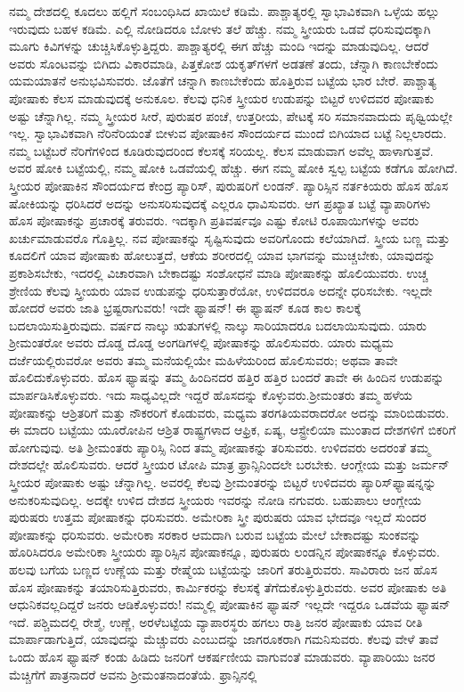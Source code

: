 ನಮ್ಮ ದೇಶದಲ್ಲಿ ಕೂದಲು ಹಲ್ಲಿಗೆ ಸಂಬಂಧಿಸಿದ ಖಾಯಿಲೆ ಕಡಿಮೆ. ಪಾಶ್ಚಾತ್ಯರಲ್ಲಿ ಸ್ವಾಭಾವಿಕವಾಗಿ ಒಳ್ಳೆಯ ಹಲ್ಲು ಇರುವುದು ಬಹಳ ಕಡಿಮೆ. ಎಲ್ಲಿ ನೋಡಿದರೂ ಬೋಳು ತಲೆ ಹೆಚ್ಚು. ನಮ್ಮ ಸ್ತ್ರೀಯರು ಒಡವೆ ಧರಿಸುವುದಕ್ಕಾಗಿ ಮೂಗು ಕಿವಿಗಳನ್ನು ಚುಚ್ಚಿಸಿಕೊಳ್ಳುತ್ತಿದ್ದರು. ಪಾಶ್ಚಾತ್ಯರಲ್ಲಿ ಈಗ ಹೆಚ್ಚು ಮಂದಿ ಇದನ್ನು ಮಾಡುವುದಿಲ್ಲ. ಆದರೆ ಅವರು ಸೊಂಟವನ್ನು ಬಿಗಿದು ವಿಕಾರಮಾಡಿ, ಪಿತ್ತಕೋಶ ಯಕೃತ್​ಗಳಗೆ ಅಡತಣೆ ತಂದು, ಚೆನ್ನಾಗಿ ಕಾಣಬೇಕೆಂದು ಯಮಯಾತನೆ ಅನುಭವಿಸುವರು. ಜೊತೆಗೆ ಚನ್ನಾಗಿ ಕಾಣಬೇಕೆಂದು ಹೊತ್ತಿರುವ ಬಟ್ಟೆಯ ಭಾರ ಬೇರೆ. ಪಾಶ್ಚಾತ್ಯ ಪೋಷಾಕು ಕೆಲಸ ಮಾಡುವುದಕ್ಕೆ ಅನುಕೂಲ. ಕೆಲವು ಧನಿಕ ಸ್ತ್ರೀಯರ ಉಡುಪನ್ನು ಬಿಟ್ಟರೆ ಉಳಿದವರ ಪೋಷಾಕು ಅಷ್ಟು ಚೆನ್ನಾಗಿಲ್ಲ. ನಮ್ಮ ಸ್ತ್ರೀಯರ ಸೀರೆ, ಪುರುಷರ ಪಂಚೆ, ಉತ್ತರೀಯ, ಪೇಟಕ್ಕೆ ಸರಿ ಸಮಾನವಾದುದು ಪೃಥ್ವಿಯಲ್ಲೇ ಇಲ್ಲ. ಸ್ವಾಭಾವಿಕವಾಗಿ ನೆರಿನೆರಿಯಂತೆ ಬೀಳುವ ಪೋಷಾಕಿನ ಸೌಂದರ್ಯದ ಮುಂದೆ ಬಿಗಿಯಾದ ಬಟ್ಟೆ ನಿಲ್ಲಲಾರದು. ನಮ್ಮ ಬಟ್ಟೆಬರೆ ನೆರಿಗೆಗಳಿಂದ ಕೂಡಿರುವುದರಿಂದ ಕೆಲಸಕ್ಕೆ ಸರಿಯಲ್ಲ. ಕೆಲಸ ಮಾಡುವಾಗ ಅವೆಲ್ಲ ಹಾಳಾಗುತ್ತವೆ. ಅವರ ಷೋಕಿ ಬಟ್ಟೆಯಲ್ಲಿ, ನಮ್ಮ ಷೋಕಿ ಒಡವೆಯಲ್ಲಿ ಹೆಚ್ಚು. ಈಗ ನಮ್ಮ ಷೋಕಿ ಸ್ವಲ್ಪ ಬಟ್ಟೆಯ ಕಡೆಗೂ ಹೋಗಿದೆ. ಸ್ತ್ರೀಯರ ಪೋಷಾಕಿನ ಸೌಂದರ್ಯದ ಕೇಂದ್ರ ಪ್ಯಾರಿಸ್​, ಪುರುಷರಿಗೆ ಲಂಡನ್​. ಪ್ಯಾರಿಸ್ಸಿನ ನರ್ತಕಿಯರು ಹೊಸ ಹೊಸ ಷೋಕಿಯನ್ನು ಧರಿಸಿದರೆ ಅದನ್ನು ಅನುಸರಿಸುವುದಕ್ಕೆ ಎಲ್ಲರೂ ಧಾವಿಸುವರು. ಆಗ ಪ್ರಖ್ಯಾತ ಬಟ್ಟೆ ವ್ಯಾಪಾರಿಗಳು ಹೊಸ ಪೋಷಾಕನ್ನು ಪ್ರಚಾರಕ್ಕೆ ತರುವರು. ಇದಕ್ಕಾಗಿ ಪ್ರತಿವರ್ಷವೂ ಎಷ್ಟು ಕೋಟಿ ರೂಪಾಯಿಗಳನ್ನು ಅವರು ಖರ್ಚುಮಾಡುವರೊ ಗೊತ್ತಿಲ್ಲ. ನವ ಪೋಷಾಕನ್ನು ಸೃಷ್ಟಿಸುವುದು ಅವರಿಗೊಂದು ಕಲೆಯಾಗಿದೆ. ಸ್ತ್ರೀಯ ಬಣ್ಣ ಮತ್ತು ಕೂದಲಿಗೆ ಯಾವ ಪೋಷಾಕು ಹೋಲುತ್ತದೆ, ಆಕೆಯ ಶರೀರದಲ್ಲಿ ಯಾವ ಭಾಗವನ್ನು ಮುಚ್ಚಬೇಕು, ಯಾವುದನ್ನು ಪ್ರಕಾಶಿಸಬೇಕು, ಇದರಲ್ಲಿ ವಿಚಾರವಾಗಿ ಬೇಕಾದಷ್ಟು ಸಂಶೋಧನೆ ಮಾಡಿ ಪೋಷಾಕನ್ನು ಹೊಲಿಯುವರು. ಉಚ್ಚ ಶ್ರೇಣಿಯ ಕೆಲವು ಸ್ತ್ರೀಯರು ಯಾವ ಉಡುಪನ್ನು ಧರಿಸುತ್ತಾರೆಯೋ, ಉಳಿದವರೂ ಅದನ್ನೇ ಧರಿಸಬೇಕು. ಇಲ್ಲದೇ ಹೋದರೆ ಅವರು ಜಾತಿ ಭ್ರಷ್ಟರಾಗುವರು! ಇದೇ ಫ್ಯಾಷನ್​! ಈ ಫ್ಯಾಷನ್​ ಕೂಡ ಕಾಲ ಕಾಲಕ್ಕೆ ಬದಲಾಯಿಸುತ್ತಿರುವುದು. ವರ್ಷದ ನಾಲ್ಕು ಋತುಗಳಲ್ಲಿ ನಾಲ್ಕು ಸಾರಿಯಾದರೂ ಬದಲಾಯಿಸುವುದು. ಯಾರು ಶ‍್ರೀಮಂತರೋ ಅವರು ದೊಡ್ಡ ದೊಡ್ಡ ಅಂಗಡಿಗಳಲ್ಲಿ ಪೋಷಾಕನ್ನು ಹೊಲಿಸುವರು. ಯಾರು ಮಧ್ಯಮ ದರ್ಜೆಯಲ್ಲಿರುವರೋ ಅವರು ತಮ್ಮ ಮನೆಯಲ್ಲಿಯೇ ಮಹಿಳೆಯರಿಂದ ಹೊಲಿಸುವರು; ಅಥವಾ ತಾವೇ ಹೊಲಿದುಕೊಳ್ಳುವರು. ಹೊಸ ಫ್ಯಾಷನ್ನು ತಮ್ಮ ಹಿಂದಿನದರ ಹತ್ತಿರ ಹತ್ತಿರ ಬಂದರೆ ತಾವೇ ಈ ಹಿಂದಿನ ಉಡುಪನ್ನು ಮಾರ್ಪಡಿಸಿಕೊಳ್ಳುವರು. ಇದು ಸಾಧ್ಯವಿಲ್ಲದೇ ಇದ್ದರೆ ಹೊಸದನ್ನು ಕೊಳ್ಳುವರು.\break ಶ‍್ರೀಮಂತರು ತಮ್ಮ ಹಳೆಯ ಪೋಷಾಕನ್ನು ಆಶ್ರಿತರಿಗೆ ಮತ್ತು ನೌಕರರಿಗೆ ಕೊಡುವರು, ಮಧ್ಯಮ ತರಗತಿಯವರಾದರೋ ಅದನ್ನು ಮಾರಿಬಿಡುವರು. ಈ ಮಾದರಿ ಬಟ್ಟೆಯು ಯೂರೋಪಿನ ಆಶ್ರಿತ ರಾಷ್ಟ್ರಗಳಾದ ಆಫ್ರಿಕ, ಏಷ್ಯ, ಆಸ್ಟ್ರೇಲಿಯಾ ಮುಂತಾದ ದೇಶಗಳಿಗೆ ಬಿಕರಿಗೆ ಹೋಗುವುವು. ಅತಿ ಶ‍್ರೀಮಂತರು ಪ್ಯಾರಿಸ್ಸಿ ನಿಂದ ತಮ್ಮ ಪೋಷಾಕನ್ನು ತರಿಸುವರು. ಉಳಿದವರು ಅದರಂತೆ ತಮ್ಮ ದೇಶದಲ್ಲೇ ಹೊಲಿಸುವರು. ಆದರೆ ಸ್ತ್ರೀಯರ ಟೋಪಿ ಮಾತ್ರ ಫ್ರಾನ್ಸಿನಿಂದಲೇ ಬರಬೇಕು. ಆಂಗ್ಲೇಯ ಮತ್ತು ಜರ್ಮನ್​ ಸ್ತ್ರೀಯರ ಪೋಷಾಕು ಅಷ್ಟು ಚೆನ್ನಾಗಿಲ್ಲ. ಅವರಲ್ಲಿ ಕೆಲವು ಶ‍್ರೀಮಂತರನ್ನು ಬಿಟ್ಟರೆ ಉಳಿದವರು ಪ್ಯಾರಿಸ್​ ಫ್ಯಾಷನ್ನನ್ನು ಅನುಕರಿಸುವುದಿಲ್ಲ. ಅದಕ್ಕೇ ಉಳಿದ ದೇಶದ ಸ್ತ್ರೀಯರು ಇವರನ್ನು ನೋಡಿ ನಗುವರು. ಬಹುಪಾಲು ಆಂಗ್ಲೇಯ ಪುರುಷರು ಉತ್ತಮ ಪೋಷಾಕನ್ನು ಧರಿಸುವರು. ಅಮೇರಿಕಾ ಸ್ತ್ರೀ ಪುರುಷರು ಯಾವ ಭೇದವೂ ಇಲ್ಲದೆ ಸುಂದರ ಪೋಷಾಕನ್ನು ಧರಿಸುವರು. ಅಮೇರಿಕಾ ಸರಕಾರ ಆಮದಾಗಿ ಬರುವ ಬಟ್ಟೆಯ ಮೇಲೆ ಬೇಕಾದಷ್ಟು ಸುಂಕವನ್ನು ಹೊರಿಸಿದರೂ ಅಮೇರಿಕಾ ಸ್ತ್ರೀಯರು ಪ್ಯಾರಿಸ್ಸಿನ ಪೋಷಾಕನ್ನೂ, ಪುರುಷರು ಲಂಡನ್ನಿನ ಪೋಷಾಕನ್ನೂ ಕೊಳ್ಳುವರು. ಹಲವು ಬಗೆಯ ಬಣ್ಣದ ಉಣ್ಣೆಯ ಮತ್ತು ರೇಷ್ಮೆಯ ಬಟ್ಟೆಯನ್ನು ಜಾರಿಗೆ ತರುತ್ತಿರುವರು. ಸಾವಿರಾರು ಜನ ಹೊಸ ಹೊಸ ಪೋಷಾಕನ್ನು ತಯಾರಿಸುತ್ತಿರುವರು, ಕಾರ್ಮಿಕರನ್ನು ಕೆಲಸಕ್ಕೆ ತೆಗೆದುಕೊಳ್ಳುತ್ತಿರುವರು. ಅವರ ಪೋಷಾಕು ಅತಿ ಆಧುನಿಕವಲ್ಲದಿದ್ದರೆ ಜನರು ಆಡಿಕೊಳ್ಳುವರು! ನಮ್ಮಲ್ಲಿ ಪೋಷಾಕಿನ ಫ್ಯಾಷನ್​ ಇಲ್ಲದೇ ಇದ್ದರೂ ಒಡವೆಯ ಫ್ಯಾಷನ್​ ಇದೆ. ಪಶ್ಚಿಮದಲ್ಲಿ ರೇಶ್ಮೆ, ಉಣ್ಣೆ, ಅರಳೆಬಟ್ಟೆಯ ವ್ಯಾಪಾರಸ್ಥರು ಹಗಲು ರಾತ್ರಿ ಜನರ ಪೋಷಾಕು ಯಾವ ರೀತಿ ಮಾರ್ಪಾ\break ಡಾಗುತ್ತಿದೆ, ಯಾವುದನ್ನು ಮೆಚ್ಚುವರು ಎಂಬುದನ್ನು ಜಾಗರೂಕರಾಗಿ ಗಮನಿಸುವರು. ಕೆಲವು ವೇಳೆ ತಾವೆ ಒಂದು ಹೊಸ ಫ್ಯಾಷನ್​ ಕಂಡು ಹಿಡಿದು ಜನರಿಗೆ ಆಕರ್ಷಣೀಯ ವಾಗುವಂತೆ ಮಾಡುವರು. ವ್ಯಾಪಾರಿಯು ಜನರ ಮೆಚ್ಚಿಗೆಗೆ ಪಾತ್ರನಾದರೆ ಅವನು ಶ‍್ರೀಮಂತನಾದಂತೆಯೆ. ಫ್ರಾನ್ಸಿನಲ್ಲಿ 